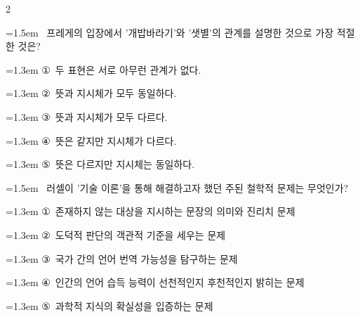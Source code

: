 \documentclass[10pt, a4paper]{article}
\begin{document}
\begin{multicols}{2}
\noindent\begin{minipage}{\columnwidth}
\vspace{2mm}
{\hangindent=1.5em  ~프레게의 입장에서 '개밥바라기'와 '샛별'의 관계를 설명한 것으로 가장 적절한 것은?\par}

\vspace{0.5mm}
{\hangindent=1.3em  \noindent\hspace{0.3em}①~두 표현은 서로 아무런 관계가 없다.\par}
{\hangindent=1.3em  \noindent\hspace{0.3em}②~뜻과 지시체가 모두 동일하다.\par}
{\hangindent=1.3em  \noindent\hspace{0.3em}③~뜻과 지시체가 모두 다르다.\par}
{\hangindent=1.3em  \noindent\hspace{0.3em}④~뜻은 같지만 지시체가 다르다.\par}
{\hangindent=1.3em  \noindent\hspace{0.3em}⑤~뜻은 다르지만 지시체는 동일하다.\par}
\vspace{4mm}
\end{minipage}
\par

\noindent\begin{minipage}{\columnwidth}
\vspace{2mm}
{\hangindent=1.5em  ~러셀이 '기술 이론'을 통해 해결하고자 했던 주된 철학적 문제는 무엇인가?\par}

\vspace{0.5mm}
{\hangindent=1.3em  \noindent\hspace{0.3em}①~존재하지 않는 대상을 지시하는 문장의 의미와 진리치 문제\par}
{\hangindent=1.3em  \noindent\hspace{0.3em}②~도덕적 판단의 객관적 기준을 세우는 문제\par}
{\hangindent=1.3em  \noindent\hspace{0.3em}③~국가 간의 언어 번역 가능성을 탐구하는 문제\par}
{\hangindent=1.3em  \noindent\hspace{0.3em}④~인간의 언어 습득 능력이 선천적인지 후천적인지 밝히는 문제\par}
{\hangindent=1.3em  \noindent\hspace{0.3em}⑤~과학적 지식의 확실성을 입증하는 문제\par}
\vspace{4mm}
\end{minipage}
\par


\end{multicols}
\end{document}

